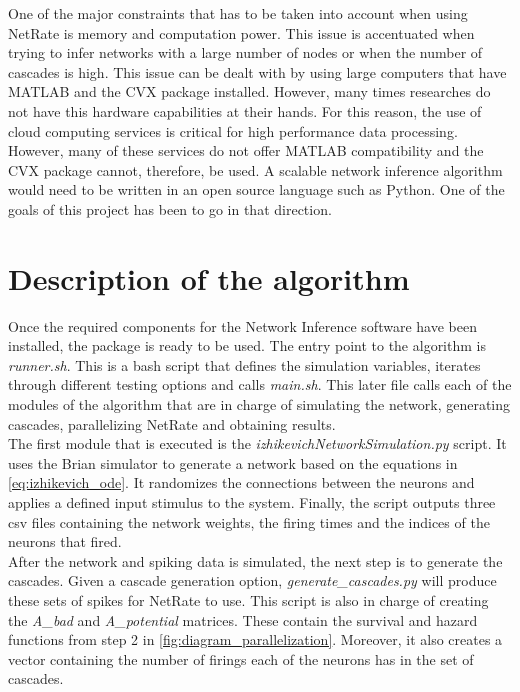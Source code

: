 One of the major constraints that has to be taken into account when using NetRate is memory and computation power. This issue is accentuated when trying to infer networks with a large number of nodes or when the number of cascades is high. This issue can be dealt with by using large computers that have MATLAB and the CVX package installed. However, many times researches do not have this hardware capabilities at their hands. For this reason, the use of cloud computing services is critical for high performance data processing. However, many of these services do not offer MATLAB compatibility and the CVX package cannot, therefore, be used. A scalable network inference algorithm would need to be written in an open source language such as Python. One of the goals of this project has been to go in that direction. 




\section{Description of the algorithm}


Once the required components for the Network Inference software have been installed, the package is ready to be used. The entry point to the algorithm is \textit{runner.sh}. This is a bash script that defines the simulation variables, iterates through different testing options and calls \textit{main.sh}. This later file calls each of the modules of the algorithm that are in charge of simulating the network, generating cascades, parallelizing NetRate and obtaining results.\\

The first module that is executed is the \textit{izhikevichNetworkSimulation.py} script. It uses the Brian simulator to generate a network based on the equations in \ref{eq:izhikevich_ode}. It randomizes the connections between the neurons and applies a defined input stimulus to the system. Finally, the script outputs three csv files containing the network weights, the firing times and the indices of the neurons that fired.\\

After the network and spiking data is simulated, the next step is to generate the cascades. Given a cascade generation option, \textit{generate\_cascades.py} will produce these sets of spikes for NetRate to use. This script is also in charge of creating the \textit{A\_bad} and \textit{A\_potential} matrices. These contain the survival and hazard functions from step 2 in \ref{fig:diagram_parallelization}. Moreover, it also creates a vector containing the number of firings each of the neurons has in the set of cascades. \\

